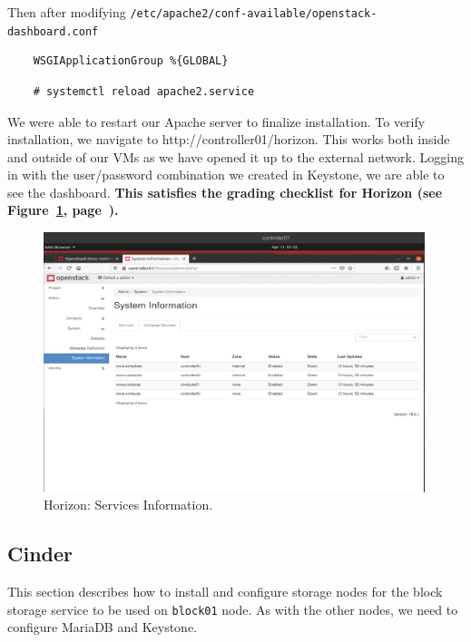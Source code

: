 \documentclass{article}
\begin{document}
Then after modifying \texttt{/etc/apache2/conf-available/openstack-dashboard.conf}

\begin{verbatim}
    WSGIApplicationGroup %{GLOBAL}
\end{verbatim}

\begin{verbatim}
    # systemctl reload apache2.service
\end{verbatim}

We were able to restart our Apache server to finalize installation. To verify installation, we navigate to http://controller01/horizon. This works both inside and outside of our VMs as we have opened it up to the external network. Logging in with the user/password combination we created in Keystone, we are able to see the dashboard. \textbf{This satisfies the grading checklist for Horizon (see Figure~\ref{fig:Horizon}, page~\pageref{fig:Horizon}).}

\begin{figure}[ht]
    \centering
    \includegraphics[width=0.99\textwidth]{Horizon.png}
    \caption{Horizon: Services Information.}
    \label{fig:Horizon}
\end{figure}






\newpage
\subsection{Cinder}

This section describes how to install and configure storage nodes for the block storage service to be used on \texttt{block01} node. As with the other nodes, we need to configure MariaDB and Keystone.
\end{document}
